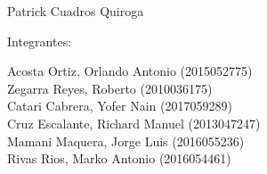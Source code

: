 \documentclass[12pt,letterpaper]{article}
\begin{document}
\begin{titlepage}
\begin{center}
\vspace*{0.1in}
\begin{large}
 Patrick Cuadros Quiroga\\
\end{large}
\vspace*{0.2in}
\vspace*{0.1in}
\begin{large}
Integrantes: \\
\begin{flushleft}
Acosta Ortiz, Orlando Antonio               \hfill	(2015052775) \\
Zegarra Reyes, Roberto  		            \hfill 	(2010036175) \\
Catari Cabrera, Yofer Nain 		\hfill 	(2017059289) \\
Cruz Escalante, Richard Manuel             \hfill 	(2013047247) \\
Mamani Maquera, Jorge Luis                   \hfill 	(2016055236) \\
Rivas Rios, Marko Antonio                       \hfill 	(2016054461) \\

\end{flushleft}
\end{large}
\end{center}
\end{titlepage}




\tableofcontents %
\thispagestyle{empty} %
\newpage
\setcounter{page}{1} %






\end{document}
